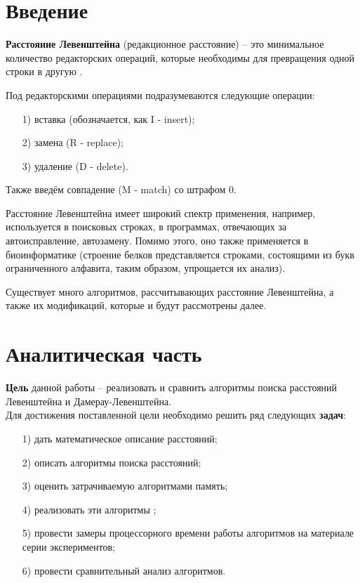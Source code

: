 \documentclass[12pt]{report}
\begin{document}
\tableofcontents

\newpage
\chapter*{Введение}

\textbf{Расстояние Левенштейна}  (редакционное расстояние) – это минимальное количество редакторских операций, которые необходимы для превращения одной строки в другую \cite{Lev_book}. 

Под редакторскими операциями подразумеваются следующие операции:
\begin{itemize}
\item[1)] вставка (обозначается, как I - insert);
\item[2)] замена (R - replace);
\item[3)] удаление (D - delete).
\end{itemize}

Также введём совпадение (M - match) со штрафом 0.

Расстояние Левенштейна имеет широкий спектр применения, например, используется в поисковых строках, в программах, отвечающих за автоисправление, автозамену. Помимо этого, оно также применяется в биоинформатике (строение белков представляется строками, состоящими из букв ограниченного алфавита, таким образом, упрощается их анализ).

Существует много алгоритмов, рассчитывающих расстояние Левенштейна, а также их модификаций, которые и будут рассмотрены далее.


\chapter{Аналитическая часть}
\textbf{Цель} данной работы – реализовать и сравнить алгоритмы поиска расстояний Левенштейна и Дамерау-Левенштейна.\\

Для достижения поставленной цели необходимо решить ряд следующих \textbf{задач}:
\begin{enumerate}
\item[1)] дать математическое описание расстояний;
\item[2)] описать алгоритмы поиска расстояний;
\item[3)] оценить затрачиваемую алгоритмами память;
\item[4)] реализовать эти алгоритмы ;
\item[5)] провести замеры процессорного времени работы алгоритмов на материале серии экспериментов;
\item[6)] провести сравнительный анализ алгоритмов.
\end{enumerate}
\end{document}
